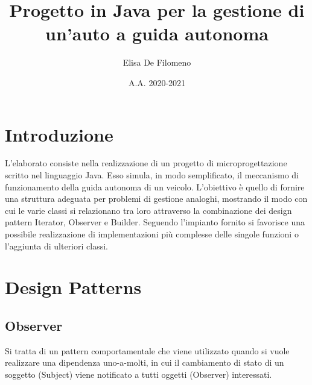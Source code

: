 \documentclass{article}
\title{Progetto in Java per la gestione di un'auto a guida autonoma}
\author{Elisa De Filomeno}
\date{A.A. 2020-2021}
\begin{document}
\maketitle
\newpage
\tableofcontents
\newpage 


\section{Introduzione}
L'elaborato consiste nella realizzazione di un progetto di microprogettazione scritto nel linguaggio Java. Esso simula, in modo semplificato, il meccanismo di funzionamento della guida autonoma di un veicolo. L'obiettivo è quello di fornire una struttura adeguata per problemi di gestione analoghi, mostrando il modo con cui le varie classi si relazionano tra loro attraverso la combinazione dei design pattern Iterator, Observer e Builder.  
Seguendo l'impianto fornito si favorisce una possibile realizzazione di implementazioni più complesse delle singole funzioni o l'aggiunta di ulteriori classi.

\section{Design Patterns}


\subsection{Observer}
Si tratta di un pattern comportamentale che viene utilizzato quando si vuole realizzare una dipendenza uno-a-molti, in cui il cambiamento di stato di un soggetto (Subject) viene notificato a tutti oggetti (Observer) interessati.
\end{document}
